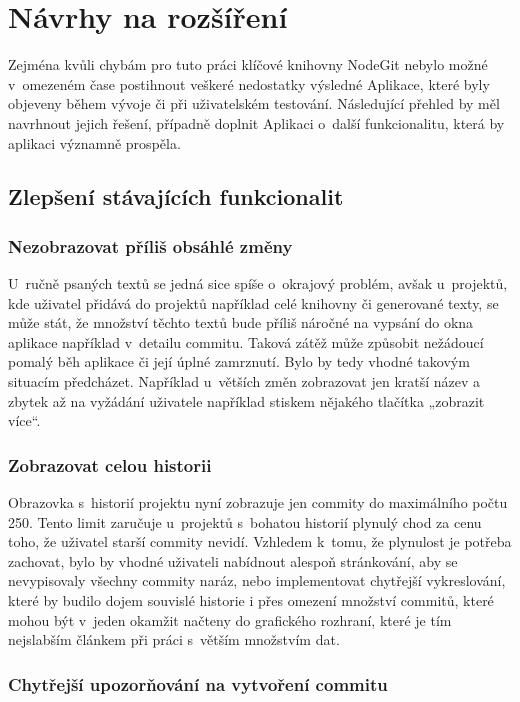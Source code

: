 \chapter{Návrhy na rozšíření}

Zejména kvůli chybám pro tuto práci klíčové knihovny NodeGit nebylo možné v~omezeném čase postihnout veškeré nedostatky výsledné Aplikace, které byly objeveny během vývoje či při uživatelském testování. Následující přehled by měl navrhnout jejich řešení, případně doplnit Aplikaci o~další funkcionalitu, která by aplikaci významně prospěla.


\section{Zlepšení stávajících funkcionalit}

\subsection{Nezobrazovat příliš obsáhlé změny}

U~ručně psaných textů se jedná sice spíše o~okrajový problém, avšak u~projektů, kde uživatel přidává do projektů například celé knihovny či generované texty, se může stát, že množství těchto textů bude příliš náročné na vypsání do okna aplikace například v~detailu commitu. Taková zátěž může způsobit nežádoucí pomalý běh aplikace či její úplné zamrznutí. Bylo by tedy vhodné takovým situacím předcházet. Například u~větších změn zobrazovat jen kratší název a zbytek až na vyžádání uživatele například stiskem nějakého tlačítka „zobrazit více“.

\subsection{Zobrazovat celou historii}

Obrazovka s~historií projektu nyní zobrazuje jen commity do maximálního počtu 250. Tento limit zaručuje u~projektů s~bohatou historií plynulý chod za cenu toho, že uživatel starší commity nevidí. Vzhledem k~tomu, že plynulost je potřeba zachovat, bylo by vhodné uživateli nabídnout alespoň stránkování, aby se nevypisovaly všechny commity naráz, nebo implementovat chytřejší vykreslování, které by budilo dojem souvislé historie i přes omezení množství commitů, které mohou být v~jeden okamžit načteny do grafického rozhraní, které je tím nejslabším článkem při práci s~větším množstvím dat.

\subsection{Chytřejší upozorňování na vytvoření commitu}

